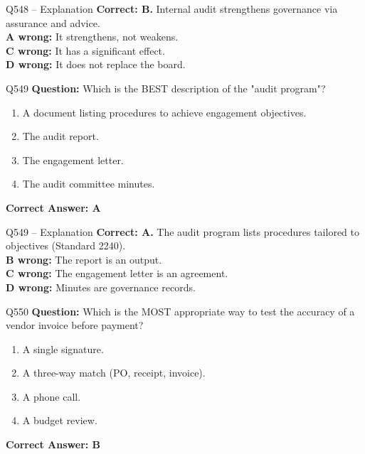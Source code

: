 \documentclass[aspectratio=169,10pt]{beamer}
\begin{document}
	\begin{frame}[t]{Q548 -- Explanation}
		\small
		\textbf{Correct: B.} Internal audit strengthens governance via assurance and advice. \\[4pt]
		\textbf{A wrong:} It strengthens, not weakens. \\[2pt]
		\textbf{C wrong:} It has a significant effect. \\[2pt]
		\textbf{D wrong:} It does not replace the board.
	\end{frame}
	
	\begin{frame}[t]{Q549}
		\small
		\textbf{Question:} Which is the BEST description of the "audit program"?
		\begin{enumerate}[label=\Alph*.,itemsep=1pt,topsep=2pt]
			\item A document listing procedures to achieve engagement objectives.
			\item The audit report.
			\item The engagement letter.
			\item The audit committee minutes.
		\end{enumerate}
		\vspace{4pt}
		\textbf{Correct Answer: A}
	\end{frame}
	
	\begin{frame}[t]{Q549 -- Explanation}
		\small
		\textbf{Correct: A.} The audit program lists procedures tailored to objectives (Standard 2240). \\[4pt]
		\textbf{B wrong:} The report is an output. \\[2pt]
		\textbf{C wrong:} The engagement letter is an agreement. \\[2pt]
		\textbf{D wrong:} Minutes are governance records.
	\end{frame}
	
	\begin{frame}[t]{Q550}
		\small
		\textbf{Question:} Which is the MOST appropriate way to test the accuracy of a vendor invoice before payment?
		\begin{enumerate}[label=\Alph*.,itemsep=1pt,topsep=2pt]
			\item A single signature.
			\item A three-way match (PO, receipt, invoice).
			\item A phone call.
			\item A budget review.
		\end{enumerate}
		\vspace{4pt}
		\textbf{Correct Answer: B}
	\end{frame}
	
\end{document}
